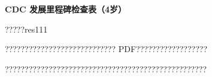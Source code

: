 \documentclass[11pt]{article}
\begin{document}
{\color[HTML]{0A84FF}\LARGE\bfseries CDC 发展里程碑检查表（4岁）\par}
{\color[HTML]{667085}\small ?????res111\par}
\vspace{1em}
???????????????????????????? PDF??????????????????

???????????????????????????????????????????????????
\end{document}
